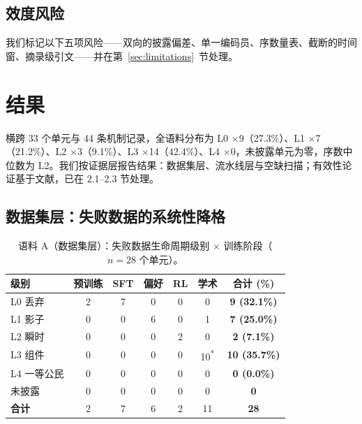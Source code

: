\documentclass[10pt,fontset=fandol]{ctexart}
\begin{document}
\subsection{效度风险}

我们标记以下五项风险——双向的披露偏差、单一编码员、序数量表、截断的时间窗、摘录级引文——并在第~\ref{sec:limitations}~节处理。

\section{结果}\label{sec:results}

横跨 33 个单元与 44 条机制记录，全语料分布为 L0 $\times$9（27.3\%）、L1 $\times$7（21.2\%）、L2 $\times$3（9.1\%）、L3 $\times$14（42.4\%）、L4 $\times$0，未披露单元为零，序数中位数为 L2。我们按证据层报告结果：数据集层、流水线层与空缺扫描；有效性论证基于文献，已在 2.1--2.3 节处理。

\subsection{数据集层：失败数据的系统性降格}

\begin{table}[t]
\centering
\caption{语料 A（数据集层）：失败数据生命周期级别 $\times$ 训练阶段（$n{=}28$ 个单元）。}
\label{tab:corpusA}
\small
\begin{tabular}{lcccccc}
\toprule
级别 & 预训练 & SFT & 偏好 & RL & 学术 & 合计 (\%) \\
\midrule
L0 丢弃   & 2 & 7 & 0 & 0 & 0 & \textbf{9 (32.1\%)} \\
L1 影子    & 0 & 0 & 6 & 0 & 1 & \textbf{7 (25.0\%)} \\
L2 瞬时 & 0 & 0 & 0 & 2 & 0 & \textbf{2 (7.1\%)} \\
L3 组件 & 0 & 0 & 0 & 0 & 10\textsuperscript{*} & \textbf{10 (35.7\%)} \\
L4 一等公民 & 0 & 0 & 0 & 0 & 0 & \textbf{0 (0.0\%)} \\
未披露 & 0 & 0 & 0 & 0 & 0 & \textbf{0} \\
\midrule
\textbf{合计} & 2 & 7 & 6 & 2 & 11 & \textbf{28} \\
\bottomrule
\end{tabular}

\vspace{2pt}
\par{}
\end{table}
\end{document}
